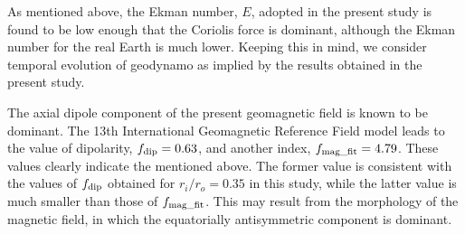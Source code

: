 As mentioned above, the Ekman number, $E$, adopted in the present study is found to be low enough that the Coriolis force is dominant, although the Ekman number for the real Earth is much lower.
Keeping this in mind, we consider temporal evolution of geodynamo as implied by the results obtained in the present study.

The axial dipole component of the present geomagnetic field is known to be dominant.
The 13th International Geomagnetic Reference Field model \cite{Alken:2021} leads to the value of dipolarity, $f_{\rm dip} = 0.63$, and another index, $f_{\rm mag\_fit} = 4.79$.
These values clearly indicate the mentioned above.
The former value is consistent with the values of $f_{\rm dip}$ obtained for $r_i / r_o = 0.35$ in this study, while the latter value is much smaller than those of $f_{\rm mag\_fit}$.
This may result from the morphology of the magnetic field, in which the equatorially antisymmetric component is dominant.



